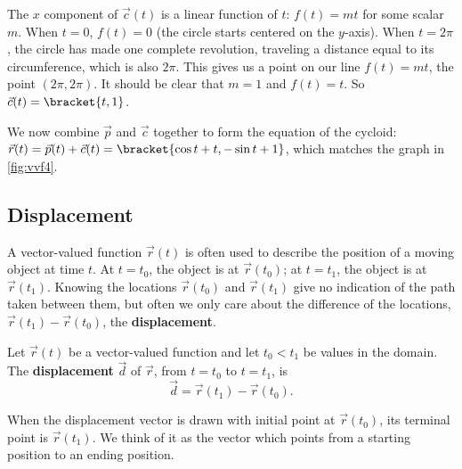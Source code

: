 \begin{example}
The $x$ component of $\vec c(t)$ is a linear function of $t$: $f(t) = mt$ for some scalar $m$. When $t=0$, $f(t) = 0$ (the circle starts centered on the $y$-axis). When $t=2\pi$, the circle has made one complete revolution, traveling a distance equal to its circumference, which is also $2\pi$. This gives us a point on our line $f(t) = mt$, the point $(2\pi, 2\pi)$. It should be clear that $m=1$ and $f(t) = t$. So $\vec c(t) =\bracket{t, 1}$. 

We now combine $\vec p$ and $\vec c$ together to form the equation of the cycloid: $\vec r(t) = \vec p(t) + \vec c(t) =\bracket{\cos t+ t,-\sin t+1}$, which
matches the graph in \autoref{fig:vvf4}.
\end{example}

\subsection{Displacement}

A vector-valued function $\vec r(t)$ is often used to describe the position of a moving object at time $t$. At $t=t_0$, the object is at $\vec r(t_0)$; at $t=t_1$, the object is at $\vec r(t_1)$. Knowing the locations $\vec r(t_0)$ and $\vec r(t_1)$ give no indication of the path taken between them, but often we only care about the difference of the locations, $\vec r(t_1)-\vec r(t_0)$, the \textbf{displacement}.

\begin{definition}[Displacement]\label{def:displacement}
Let $\vec r(t)$ be a vector-valued function and let $t_0<t_1$ be values in the domain. The \textbf{displacement} $\vec d$ of $\vec r$, from $t=t_0$ to $t=t_1$, is \[\vec d=\vec r(t_1)-\vec r(t_0).\]
\end{definition}

When the displacement vector is drawn with initial point at $\vec r(t_0)$, its terminal point is $\vec r(t_1)$. We think of it as the vector which points from a starting position to an ending position.

